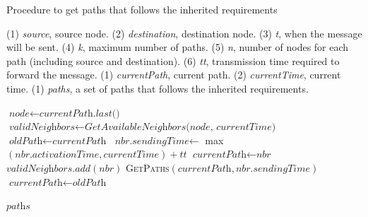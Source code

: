 \begin{algorithm}
\caption{Procedure to get paths that follows the inherited requirements}
\label{alg:get-paths}
\begin{algorithmic}[1]
\INHERIT (1) \textit{source}, source node. (2) \textit{destination}, destination node. (3) \textit{t}, when the message will be sent. (4) \textit{k}, maximum number of paths. (5) \textit{n}, number of nodes for each path (including source and destination). (6) \textit{tt}, transmission time required to forward the message.
\INPUT (1) \textit{currentPath}, current path. (2) \textit{currentTime}, current time.
\OUTPUT (1) \textit{paths}, a set of paths that follows the inherited requirements.

	\State $\textit{node} \gets \textit{currentPath.last()}$
	\State $\textit{validNeighbors} \gets \textit{GetAvailableNeighbors(node, currentTime)}$
		\State $\textit{oldPath} \gets \textit{currentPath}$
		\State $\textit{nbr.sendingTime} \gets$ max$(\textit{nbr.activationTime}, \textit{currentTime}) + tt$
		\State $\textit{currentPath} \gets \textit{nbr}$
			\State $\textit{validNeighbors}.add(\textit{nbr})$
		\Else
			\State \textsc{GetPaths}$(\textit{currentPath}, \textit{nbr.sendingTime})$	
		\EndIf
		\State $\textit{currentPath} \gets \textit{oldPath}$
	\EndFor
\EndIf

\State \Return$\textit{paths}$
\EndProcedure
\end{algorithmic}
\end{algorithm}